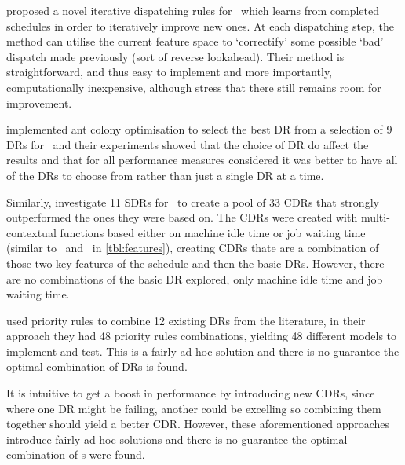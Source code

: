 \citet{Nguyen13} proposed a novel {iterative dispatching rules} for \JSP\ 
which learns from completed schedules in order to iteratively improve new ones. 
At each dispatching step, the method can utilise the current feature space to 
`correctify' some possible `bad' dispatch made previously (sort of reverse 
lookahead). Their method is straightforward, and thus easy to implement and 
more importantly, computationally inexpensive, although \citeauthor{Nguyen13} 
stress that there still remains room for improvement. 

\citet{Korytkowski13} implemented {ant colony optimisation} to select the 
best DR from a selection of 9 DRs for \JSP\ and their experiments showed 
that the choice of DR do affect the results and that for all performance 
measures considered it was better to have all of the DRs to choose from rather 
than just a single DR at a time. 

Similarly, \citet{Lu13} investigate 11 SDRs for \JSP\ to create a pool of 
33 CDRs that strongly outperformed the ones they were based on. The CDRs were 
created with {multi-contextual functions} based either on machine idle time 
or job waiting time (similar to \phiwait\ and \phimacSlack\ in 
\cref{tbl:features}), creating CDRs thate are a combination of those 
two key features of the schedule and then the basic DRs. However, there are no 
combinations of the basic DR explored, only machine idle time and job waiting 
time.  

\citet{Yu13} used priority rules to combine 12 existing DRs from the 
literature, in their approach they had 48 priority rules combinations, 
yielding 48 different models to implement and test. This is a fairly 
ad-hoc solution and there is no guarantee the optimal combination of DRs is 
found. 

It is intuitive to get a boost in performance by introducing new CDRs, since 
where one DR might be failing, another could be excelling so combining them 
together should yield a better CDR. However, these aforementioned approaches 
introduce fairly ad-hoc solutions and there is no guarantee the optimal 
combination of \dr s were found.


